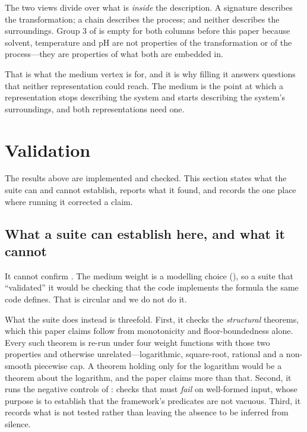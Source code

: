 \documentclass[11pt,twocolumn,a4paper]{article}
\theoremstyle{thmstyle}
\theoremstyle{definition}
\theoremstyle{remark}
\begin{document}
The two views divide over what is \emph{inside} the description. A
signature describes the transformation; a chain describes the process; and
neither describes the surroundings. Group 3 of  is
empty for both columns before this paper because solvent, temperature and
pH are not properties of the transformation or of the process---they are
properties of what both are embedded in.

That is what the medium vertex is for, and it is why filling it answers
questions that neither representation could reach. The medium is the point
at which a representation stops describing the system and starts
describing the system's surroundings, and both representations need one.

\section{Validation}
\label{sec:validation}

The results above are implemented and checked. This section states what
the suite can and cannot establish, reports what it found, and records
the one place where running it corrected a claim.

\subsection{What a suite can establish here, and what it cannot}

It cannot confirm . The medium weight is a
modelling choice (), so a suite that ``validated'' it would
be checking that the code implements the formula the same code defines.
That is circular and we do not do it.

What the suite does instead is threefold. First, it checks the
\emph{structural} theorems, which this paper claims follow from
monotonicity and floor-boundedness alone. Every such theorem is re-run
under four weight functions with those two properties and otherwise
unrelated---logarithmic, square-root, rational and a non-smooth piecewise
cap. A theorem holding only for the logarithm would be a theorem about
the logarithm, and the paper claims more than that. Second, it runs the
negative controls of : checks that must \emph{fail} on
well-formed input, whose purpose is to establish that the framework's
predicates are not vacuous. Third, it records what is not tested rather
than leaving the absence to be inferred from silence.
\end{document}
